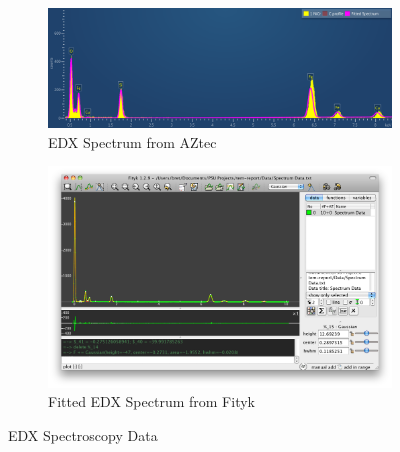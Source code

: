 \documentclass[12pt,a4paper]{article}
\begin{document}
\begin{figure}
  \begin{subfigure}[b]{0.5\textwidth}
    \includegraphics[width=\textwidth]{Data/EDS Spectrum.png}
    \caption{EDX Spectrum from AZtec}
    \label{fig:aztec}
  \end{subfigure}%

  \begin{subfigure}[b]{0.5\textwidth}
    \includegraphics[width=\textwidth]{Data/full.png}
    \caption{Fitted EDX Spectrum from Fityk}
    \label{fig:fitk}
  \end{subfigure}%

  \caption{EDX Spectroscopy Data}
  \label{fig:edx}
\end{figure}
\end{document}
